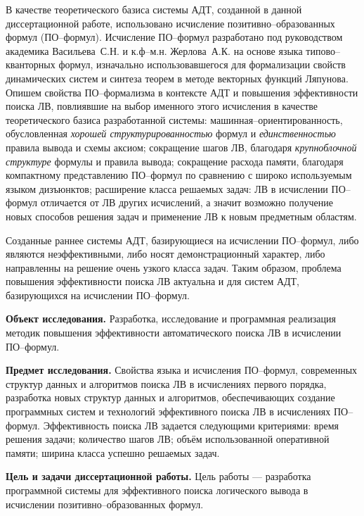 \documentclass[a4paper]{report}
\begin{document}
В качестве теоретического базиса системы АДТ, созданной в данной диссертационной работе, использовано исчисление позитивно--образованных формул (ПО--формул). Исчисление ПО--формул разработано под руководством академика Васильева~С.Н. и к.ф--м.н. Жерлова~А.К. на основе языка типово--кванторных формул, изначально использовавшегося для формализации свойств динамических систем и синтеза теорем в методе векторных функций Ляпунова. Опишем свойства ПО--формализма в контексте АДТ и повышения эффективности поиска ЛВ, повлиявшие на выбор именного этого исчисления в качестве теоретического базиса разработанной системы: машинная--ориентированность, обусловленная \emph{хорошей структурированностью} формул и \emph{единственностью} правила вывода и схемы аксиом; сокращение шагов ЛВ, благодаря \emph{крупноблочной структуре} формулы и правила вывода; сокращение расхода памяти, благодаря компактному представлению ПО--формул по сравнению с широко используемым языком дизъюнктов; расширение класса решаемых задач: ЛВ в исчислении ПО--формул отличается от ЛВ других исчислений, а значит возможно получение новых способов решения задач и применение ЛВ к новым предметным областям.

Созданные раннее системы АДТ, базирующиеся на исчислении ПО--формул, либо являются неэффективными, либо носят демонстрационный характер, либо направленны на решение очень узкого класса задач. Таким образом, проблема повышения эффективности поиска ЛВ актуальна и для систем АДТ, базирующихся на исчислении ПО--формул.

\textbf{Объект исследования.}
Разработка, исследование и программная реализация методик повышения эффективности автоматического поиска ЛВ в исчислении ПО--формул.

\textbf{Предмет исследования.}
Свойства языка и исчисления ПО--формул, современных структур данных и алгоритмов поиска ЛВ в исчислениях первого порядка, разработка новых структур данных и алгоритмов, обеспечивающих создание программных систем и технологий эффективного поиска ЛВ в исчислениях ПО--формул. Эффективность поиска ЛВ задается следующими критериями: время решения задачи; количество шагов ЛВ; объём использованной оперативной памяти; ширина класса успешно решаемых задач.

\textbf{Цель и задачи диссертационной работы.}
Цель работы --- разработка программной системы для эффективного поиска логического вывода в исчислении позитивно--образованных формул.
\end{document}
